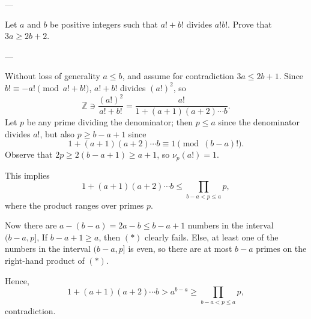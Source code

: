 
---

Let $a$ and $b$ be positive integers such that $a!+b!$ divides $a!b!$. Prove that $3a\ge2b+2$.

---

Without loss of generality $a\le b$, and assume for contradiction $3a\le2b+1$. Since $b!\equiv-a!\pmod{a!+b!}$, $a!+b!$ divides $(a!)^2$, so
\[\mathbb Z\ni\frac{(a!)^2}{a!+b!}=\frac{a!}{1+(a+1)(a+2)\cdots b}.\]
Let $p$ be any prime dividing the denominator; then $p\le a$ since the denominator divides $a!$, but also $p\ge b-a+1$ since
\[1+(a+1)(a+2)\cdots b\equiv1\pmod{(b-a)!}.\]
Observe that $2p\ge2(b-a+1)\ge a+1$, so $\nu_p(a!)=1$.

This implies
\[1+(a+1)(a+2)\cdots b\le\prod_{b-a<p\le a}p,\tag{$*$}\]
where the product ranges over primes $p$.

Now there are $a-(b-a)=2a-b\le b-a+1$ numbers in the interval $(b-a,p]$,
If $b-a+1\ge a$, then $(*)$ clearly fails.
Else, at least one of the numbers in the interval $(b-a,p]$ is even, so there are at most $b-a$ primes on the right-hand product of $(*)$.

Hence,
\[1+(a+1)(a+2)\cdots b>a^{b-a}\ge\prod_{b-a<p\le a}p,\]
contradiction.

